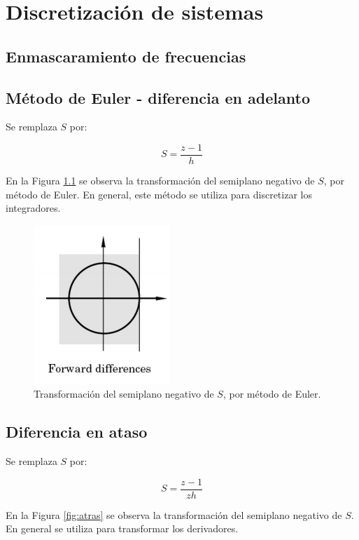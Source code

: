\chapter{Discretización de sistemas}

\section{Enmascaramiento de frecuencias}


\section{Método de Euler - diferencia en adelanto}

Se remplaza $S$ por:  

\begin{equation}
    S = \frac{z-1}{h}
\end{equation}

En la Figura \ref{fig:euler} se observa la transformación del semiplano negativo de $S$,
por método de Euler. En general, este método se utiliza para discretizar los integradores.

\begin{figure}
    \centering
    \includegraphics[width=.3\textwidth]{img/Euler.png}
    \caption{Transformación del semiplano negativo de $S$, por método de Euler.}
    \label{fig:euler}
\end{figure}

\section{Diferencia en ataso}

Se remplaza $S$ por: 

\begin{equation}
    S = \frac{z-1}{zh}
\end{equation}

En la Figura \ref{fig:atras} se observa la transformación del semiplano negativo de $S$.
En general se utiliza para transformar los derivadores.

